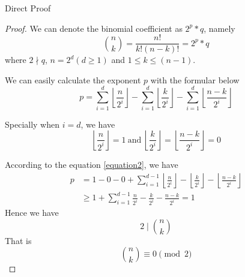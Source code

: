 \item Direct Proof
\begin{proof}
We can denote the binomial coefficient as $2^p * q$, namely
\begin{equation}\label{equation2}
\binom{n}{k} = \frac{n!}{k!(n - k)!} = 2^p * q
\end{equation}
where $2 \nmid q$, $n = 2^d(d \geq 1)$ and $1\leq k\leq (n - 1)$.

We can easily calculate the exponent $p$ with the formular below
\begin{displaymath}
p = \sum_{i = 1}^{d}\left\lfloor \frac{n}{2^i} \right\rfloor - \sum_{i = 1}^{d}\left\lfloor \frac{k}{2^i}\right\rfloor - \sum_{i = 1}^{d}\left\lfloor \frac{n - k}{2^i}\right\rfloor
\end{displaymath}

Specially when $i = d$, we have
\begin{displaymath}
\left\lfloor \frac{n}{2^i} \right\rfloor = 1~\text{and}~\left\lfloor \frac{k}{2^i}\right\rfloor = \left\lfloor \frac{n - k}{2^i}\right\rfloor = 0
\end{displaymath}

According to the equation \eqref{equation2}, we have
\begin{displaymath}
	\begin{split}
		p &= 1 - 0 - 0 + \sum_{i = 1}^{d - 1} \left\lfloor \frac{n}{2^i}\right\rfloor - \left\lfloor \frac{k}{2^i}\right\rfloor - \left\lfloor \frac{n - k}{2^i}\right\rfloor\\
		&\geq 1  + \sum_{i = 1}^{d - 1} \frac{n}{2^i} - \frac{k}{2^i} - \frac{n - k}{2^i} = 1
	\end{split}
\end{displaymath}
Hence we have
\[2 \mid{\binom{n}{k}}\]
That is
\[\binom{n}{k} \equiv 0 \pmod{2}\]
\end{proof}
